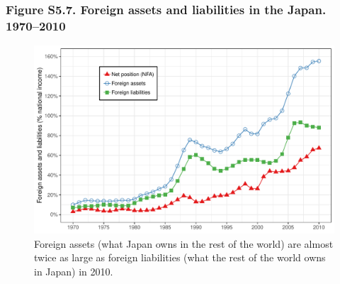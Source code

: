 \documentclass[t]{beamer}\usepackage[]{graphicx}\usepackage[]{color}
\makeatletter
\def\maxwidth{ %
  \ifdim\Gin@nat@width>\linewidth
    \linewidth
  \else
    \Gin@nat@width
  \fi
}
\newenvironment{knitrout}{}{} %
\makeatother
\begin{document}
\begin{frame}[label=Figure_S5_7]
\frametitle{Figure S5.7. Foreign assets and liabilities in the Japan. 1970--2010}
\begin{figure}[t]
\begin{minipage}[b]{\textwidth}
\centering
\begin{knitrout}\footnotesize
{}\color{fgcolor}

{\centering \includegraphics[width=\maxwidth]{figures/color/Figure_S5_7} 

}



\end{knitrout}
\caption{Foreign assets (what Japan owns in the rest of the world) are almost twice as large as foreign liabilities (what the rest of the world owns in Japan) in 2010.}
\end{minipage}
\end{figure}
\end{frame}
\end{document}
